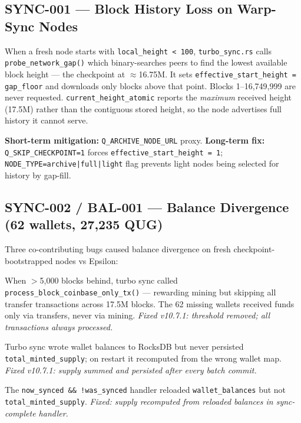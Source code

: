 \documentclass[12pt,a4paper]{article}
\begin{document}
\subsection{SYNC-001 — Block History Loss on Warp-Sync Nodes}

When a fresh node starts with \texttt{local\_height < 100}, \texttt{turbo\_sync.rs}
calls \texttt{probe\_network\_gap()} which binary-searches peers to find the lowest
available block height — the checkpoint at $\approx$16.75M.
It sets \texttt{effective\_start\_height = gap\_floor} and downloads only blocks above
that point. Blocks 1--16,749,999 are never requested.
\texttt{current\_height\_atomic} reports the \emph{maximum} received height (17.5M)
rather than the contiguous stored height, so the node advertises full history it
cannot serve.

\textbf{Short-term mitigation:} \texttt{Q\_ARCHIVE\_NODE\_URL} proxy.
\textbf{Long-term fix:} \texttt{Q\_SKIP\_CHECKPOINT=1} forces
\texttt{effective\_start\_height = 1}; \texttt{NODE\_TYPE=archive|full|light} flag
prevents light nodes being selected for history by gap-fill.

\subsection{SYNC-002 / BAL-001 — Balance Divergence (62 wallets, 27,235 QUG)}

Three co-contributing bugs caused balance divergence on fresh checkpoint-bootstrapped
nodes vs Epsilon:

\begin{description}[leftmargin=0pt]
  \item[\textbf{Bug A — Transfer-skip threshold:}]
    When $>$5,000 blocks behind, turbo sync called
    \texttt{process\_block\_coinbase\_only\_tx()} — rewarding mining but skipping
    all transfer transactions across 17.5M blocks.
    The 62 missing wallets received funds only via transfers, never via mining.
    \emph{Fixed v10.7.1: threshold removed; all transactions always processed.}

  \item[\textbf{Bug B — Supply not persisted:}]
    Turbo sync wrote wallet balances to RocksDB but never persisted
    \texttt{total\_minted\_supply}; on restart it recomputed from the wrong wallet map.
    \emph{Fixed v10.7.1: supply summed and persisted after every batch commit.}

  \item[\textbf{Bug C — Post-sync reload omits supply:}]
    The \texttt{now\_synced \&\& !was\_synced} handler reloaded \texttt{wallet\_balances}
    but not \texttt{total\_minted\_supply}.
    \emph{Fixed: supply recomputed from reloaded balances in sync-complete handler.}
\end{description}
\end{document}
